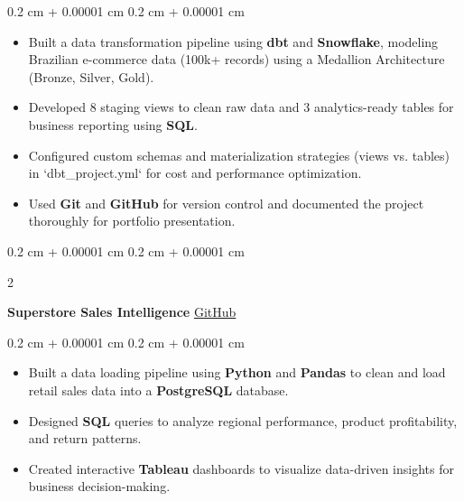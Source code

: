 \documentclass[10pt, letterpaper]{article}
\newenvironment{highlights}{
    \begin{itemize}[
        topsep=0.10 cm,
        parsep=0.10 cm,
        partopsep=0pt,
        itemsep=0pt,
        leftmargin=0.4 cm + 10pt
    ]
}{
    \end{itemize}
} %
\newenvironment{onecolentry}{
    \begin{adjustwidth}{
        0.2 cm + 0.00001 cm
    }{
        0.2 cm + 0.00001 cm
    }
}{
    \end{adjustwidth}
} %
\newenvironment{twocolentry}[2][]{
    \onecolentry
    \def\secondColumn{#2}
    \setcolumnwidth{\fill, 4.5 cm}
    \begin{paracol}{2}
}{
    \switchcolumn \raggedleft \secondColumn
    \end{paracol}
    \endonecolentry
} %
\begin{document}
        \vspace{0.10 cm}
        \begin{onecolentry}
            \begin{highlights}
                \item Built a data transformation pipeline using \textbf{dbt} and \textbf{Snowflake}, modeling Brazilian e-commerce data (100k+ records) using a Medallion Architecture (Bronze, Silver, Gold).
                \item Developed 8 staging views to clean raw data and 3 analytics-ready tables for business reporting using \textbf{SQL}.
                \item Configured custom schemas and materialization strategies (views vs. tables) in `dbt\_project.yml` for cost and performance optimization.
                \item Used \textbf{Git} and \textbf{GitHub} for version control and documented the project thoroughly for portfolio presentation.
            \end{highlights}
        \end{onecolentry}

        \vspace{0.2 cm}

        \begin{twocolentry}{
            \href{https://github.com/Rowan123204/superstore-sales-intelligence}{GitHub}
        }
            \textbf{Superstore Sales Intelligence}\end{twocolentry}

        \vspace{0.10 cm}
        \begin{onecolentry}
            \begin{highlights}
                \item Built a data loading pipeline using \textbf{Python} and \textbf{Pandas} to clean and load retail sales data into a \textbf{PostgreSQL} database.
                \item Designed \textbf{SQL} queries to analyze regional performance, product profitability, and return patterns.
                \item Created interactive \textbf{Tableau} dashboards to visualize data-driven insights for business decision-making.
            \end{highlights}
        \end{onecolentry}

        \vspace{0.2 cm}
\end{document}
